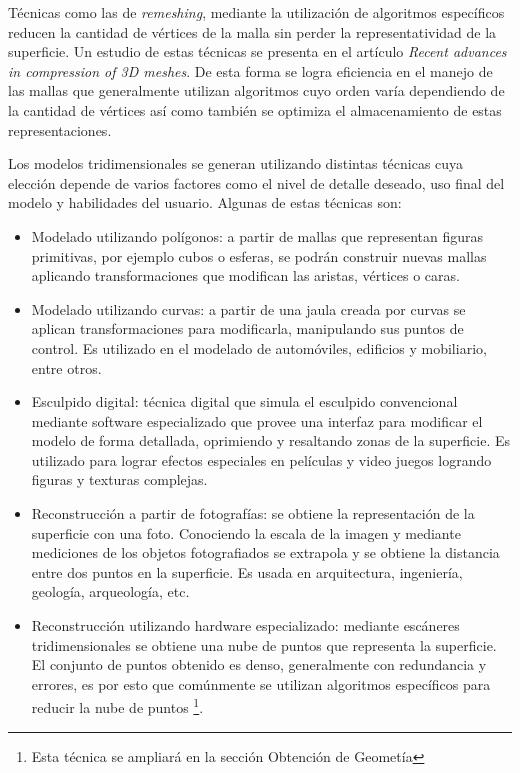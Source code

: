 Técnicas como las de \emph{remeshing}, mediante la utilización de algoritmos específicos reducen la cantidad de vértices de la malla sin perder la representatividad de la superficie.
Un estudio de estas técnicas se presenta en el artículo \emph{Recent advances in compression of 3D meshes\cite{Mesh_building}}.
De esta forma se logra eficiencia en el manejo de las mallas que generalmente utilizan algoritmos cuyo orden varía dependiendo de la cantidad de vértices así como también se optimiza el almacenamiento de estas representaciones.

Los modelos tridimensionales se generan utilizando distintas técnicas cuya elección depende de varios factores como el nivel de detalle deseado, uso final del modelo y habilidades del usuario. Algunas de estas técnicas son:
\begin{itemize}
  \item Modelado utilizando polígonos: a partir de mallas que representan figuras primitivas, por ejemplo cubos o esferas, se podrán construir nuevas mallas aplicando transformaciones que modifican las aristas, vértices o caras.
  
  \item Modelado utilizando curvas: a partir de una jaula creada por curvas se aplican transformaciones para modificarla, manipulando sus puntos de control. Es utilizado en el modelado de automóviles, edificios y mobiliario, entre otros.

  \item Esculpido digital: técnica digital que simula el esculpido convencional mediante software especializado que provee una interfaz para modificar el modelo de forma detallada, oprimiendo y resaltando zonas de la superficie. Es utilizado para lograr efectos especiales en películas y video juegos logrando figuras y texturas complejas.

  \item Reconstrucción a partir de fotografías: se obtiene la representación de la superficie con una foto. Conociendo la escala de la imagen y mediante mediciones de los objetos fotografiados se extrapola y se obtiene la distancia entre dos puntos en la superficie. Es usada en arquitectura, ingeniería, geología, arqueología, etc.
  
  \item Reconstrucción utilizando hardware especializado: mediante escáneres tridimensionales se obtiene una nube de puntos que representa la superficie. El conjunto de puntos obtenido es denso, generalmente con redundancia y errores, es por esto que comúnmente se utilizan algoritmos específicos para reducir la nube de puntos \footnote{Esta técnica se ampliará en la sección Obtención de Geometía}.
\end{itemize}

